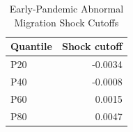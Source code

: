 \begin{table}[!htbp]\centering
\caption{Early-Pandemic Abnormal Migration Shock Cutoffs}\label{tab:shock_quantiles}
\begin{tabular}{lr}\toprule
Quantile & Shock cutoff \\
\midrule
P20 & -0.0034 \\
P40 & -0.0008 \\
P60 & 0.0015 \\
P80 & 0.0047 \\
\bottomrule
\end{tabular}
\end{table}
